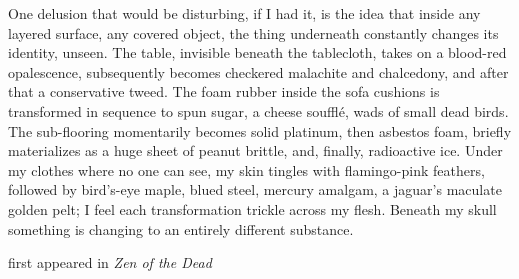 One delusion that would be disturbing, if I had it, is the idea that
inside any layered surface, any covered object, the thing underneath
constantly changes its identity, unseen. The table, invisible beneath
the tablecloth, takes on a blood-red opalescence, subsequently becomes
checkered malachite and chalcedony, and after that a conservative tweed.
The foam rubber inside the sofa cushions is transformed in sequence to
spun sugar, a cheese soufflé, wads of small dead birds. The sub-flooring
momentarily becomes solid platinum, then asbestos foam, briefly
materializes as a huge sheet of peanut brittle, and, finally,
radioactive ice. Under my clothes where no one can see, my skin tingles
with flamingo-pink feathers, followed by bird's-eye maple, blued steel,
mercury amalgam, a jaguar's maculate golden pelt; I feel each
transformation trickle across my flesh. Beneath my skull something is
changing to an entirely different substance.

first appeared in \emph{Zen of the Dead}
